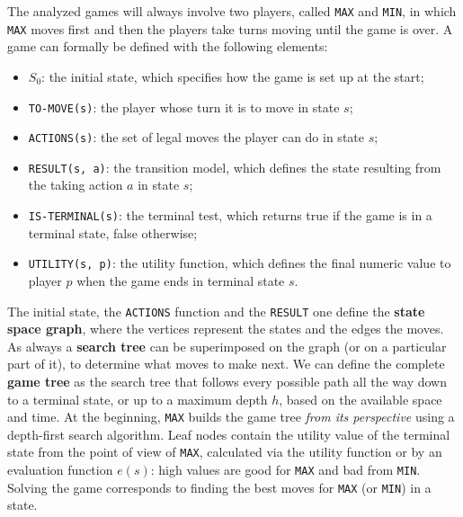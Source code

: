 \documentclass{article}
\newcommand{\code}{\lstinline}
\begin{document}
The analyzed games will always involve two players, called \code{MAX} and \code{MIN}, in which \code{MAX} moves first and then the players take turns moving until the game is over. A game can formally be defined with the following elements:
\begin{itemize}
    \item $S_0$: the initial state, which specifies how the game is set up at the start;
    \item \code{TO-MOVE(s)}: the player whose turn it is to move in state $s$;
    \item \code{ACTIONS(s)}: the set of legal moves the player can do in state $s$;
    \item \code{RESULT(s, a)}: the transition model, which defines the state resulting from the taking action $a$ in state $s$;
    \item \code{IS-TERMINAL(s)}: the terminal test, which returns true if the game is in a terminal state, false otherwise;
    \item \code{UTILITY(s, p)}: the utility function, which defines the final numeric value to player $p$ when the game ends in terminal state $s$.
\end{itemize}

The initial state, the \code{ACTIONS} function and the \code{RESULT} one define the \textbf{state space graph}, where the vertices represent the states and the edges the moves. As always a \textbf{search tree} can be superimposed on the graph (or on a particular part of it), to determine what moves to make next. We can define the complete \textbf{game tree} as the search tree that follows every possible path all the way down to a terminal state, or up to a maximum depth $h$, based on the available space and time. At the beginning, \code{MAX} builds the game tree \textit{from its perspective} using a depth-first search algorithm. Leaf nodes contain the utility value of the terminal state from the point of view of \code{MAX}, calculated via the utility function or by an evaluation function $e(s)$: high values are good for \code{MAX} and bad from \code{MIN}. Solving the game corresponds to finding the best moves for \code{MAX} (or \code{MIN}) in a state.
\end{document}
